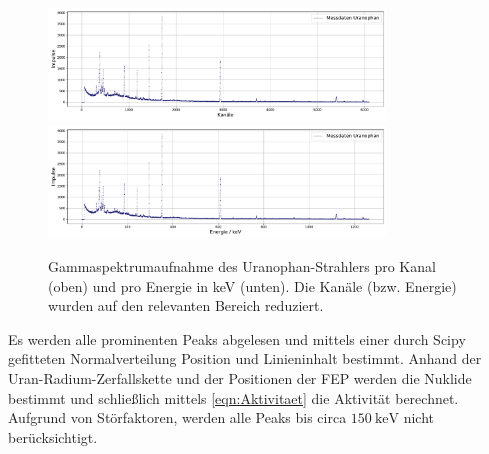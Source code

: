 \begin{figure}
    \centering
    \includegraphics[width = 0.8\textwidth]{plots/uran_channel.pdf}
    \includegraphics[width = 0.8\textwidth]{plots/uran_energy.pdf}
    \caption{Gammaspektrumaufnahme des Uranophan-Strahlers pro Kanal (oben) und pro Energie in keV (unten). Die Kanäle (bzw. Energie) wurden auf den relevanten Bereich reduziert.}
    \label{fig:Uranophan}
\end{figure}

Es werden alle prominenten Peaks abgelesen und mittels einer durch Scipy\cite{scipy} gefitteten Normalverteilung Position und Linieninhalt bestimmt. Anhand der Uran-Radium-Zerfallskette und der Positionen 
der FEP werden die Nuklide bestimmt und schließlich mittels \autoref{eqn:Aktivitaet} die Aktivität berechnet. Aufgrund von Störfaktoren, werden alle Peaks bis circa $\qty{150}{\kilo\electronvolt}$
nicht berücksichtigt.

